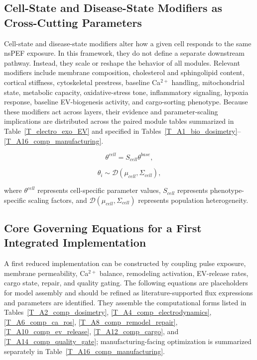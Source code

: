 \documentclass[Afour,sagev,times]{sagej}
\begin{document}
\subsection*{Cell-State and Disease-State Modifiers as Cross-Cutting Parameters}

Cell-state and disease-state modifiers alter how a given cell responds to the same nsPEF exposure. In this framework, they do not define a separate downstream pathway. Instead, they scale or reshape the behavior of all modules. Relevant modifiers include membrane composition, cholesterol and sphingolipid content, cortical stiffness, cytoskeletal prestress, baseline Ca$^{2+}$ handling, mitochondrial state, metabolic capacity, oxidative-stress tone, inflammatory signaling, hypoxia response, baseline EV-biogenesis activity, and cargo-sorting phenotype. Because these modifiers act across layers, their evidence and parameter-scaling implications are distributed across the paired module tables summarized in Table~\ref{T_electro_exo_EV} and specified in Tables~\ref{T_A1_bio_dosimetry}--\ref{T_A16_comp_manufacturing}.

\begin{equation}
\theta^{cell}=S_{cell}\theta^{base},
\end{equation}

\begin{equation}
\theta_i\sim \mathcal{D}(\mu_{cell},\Sigma_{cell}),
\end{equation}

where $\theta^{cell}$ represents cell-specific parameter values, $S_{cell}$ represents phenotype-specific scaling factors, and $\mathcal{D}(\mu_{cell},\Sigma_{cell})$ represents population heterogeneity.

\subsection*{Core Governing Equations for a First Integrated Implementation}

A first reduced implementation can be constructed by coupling pulse exposure, membrane permeability, Ca$^{2+}$ balance, remodeling activation, EV-release rates, cargo state, repair, and quality gating. The following equations are placeholders for model assembly and should be refined as literature-supported flux expressions and parameters are identified. They assemble the computational forms listed in Tables~\ref{T_A2_comp_dosimetry}, \ref{T_A4_comp_electrodynamics}, \ref{T_A6_comp_ca_ros}, \ref{T_A8_comp_remodel_repair}, \ref{T_A10_comp_ev_release}, \ref{T_A12_comp_cargo}, and \ref{T_A14_comp_quality_gate}; manufacturing-facing optimization is summarized separately in Table~\ref{T_A16_comp_manufacturing}.
\end{document}
